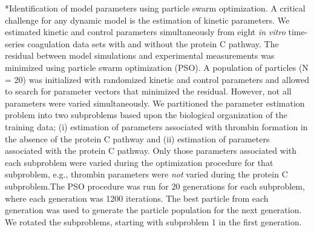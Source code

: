 \documentclass[12pt]{article}
\makeatletter
\renewcommand\subsection{\@startsection
	{subsection}{2}{0mm}
	{-0.05in}
	{-0.5\baselineskip}
	{\normalfont\normalsize\bfseries}}
\makeatother
\begin{document}
\subsection*{Identification of model parameters using particle swarm optimization.}
A critical challenge for any dynamic model is the estimation of kinetic parameters. 
We estimated kinetic and control parameters simultaneously from eight \emph{in vitro} time-series coagulation data sets with and without the protein C pathway. 
The residual between model simulations and experimental measurements was minimized using particle swarm optimization (PSO). 
A population of particles (N = 20) was initialized with randomized kinetic and control parameters and allowed to search for parameter vectors that minimized
the residual. However, not all parameters were varied simultaneously. 
We partitioned the parameter estimation problem into two subproblems based upon the biological organization of the training data; 
(i) estimation of parameters associated with thrombin formation in the absence of the protein C pathway and (ii) estimation of parameters associated with the protein C pathway.
Only those parameters associated with each subproblem were varied during the optimization procedure for that subproblem, e.g., thrombin parameters were \textit{not} varied during the protein C subproblem.The PSO procedure was run for 20 generations for each subproblem, where each generation was 1200 iterations. The best particle from each generation was used to generate the particle population for the next generation. We rotated the subproblems, starting with subproblem 1 in the first generation.
\end{document}
